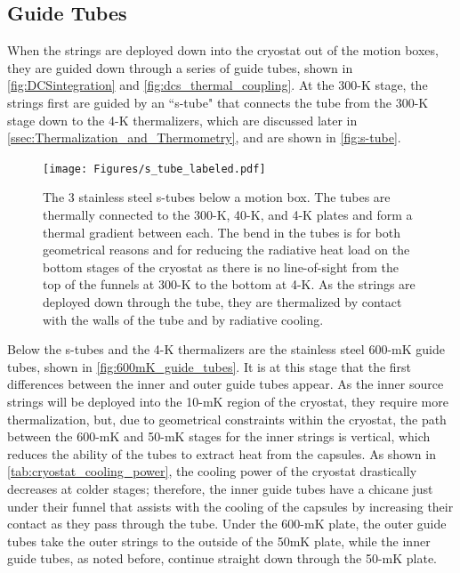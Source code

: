 \subsection*{Guide Tubes}
When the strings are deployed down into the cryostat out of the motion boxes, they are guided down through a series of guide tubes, shown in \autoref{fig:DCSintegration} and \autoref{fig:dcs_thermal_coupling}.
At the 300-K stage, the strings first are guided by an ``s-tube" that connects the tube from the 300-K stage down to the 4-K thermalizers, which are discussed later in \autoref{ssec:Thermalization_and_Thermometry}, and are shown in \autoref{fig:s-tube}.
\begin{figure}[htbp]
    \centering
    \texttt{[image: Figures/s\_tube\_labeled.pdf]}
    \caption[The 3 stainless steel s-tubes below a motion box.]
    {The 3 stainless steel s-tubes below a motion box.
    The tubes are thermally connected to the 300-K, 40-K, and 4-K plates and form a thermal gradient between each.
    The bend in the tubes is for both geometrical reasons and for reducing the radiative heat load on the bottom stages of the cryostat as there is no line-of-sight from the top of the funnels at 300-K to the bottom at 4-K.
    As the strings are deployed down through the tube, they are thermalized by contact with the walls of the tube and by radiative cooling.}
    \label{fig:s-tube}
\end{figure}
Below the s-tubes and the 4-K thermalizers are the stainless steel 600-mK guide tubes, shown in \autoref{fig:600mK_guide_tubes}.
It is at this stage that the first differences between the inner and outer guide tubes appear.
As the inner source strings will be deployed into the 10-mK region of the cryostat, they require more thermalization, but, due to geometrical constraints within the cryostat, the path between the 600-mK and 50-mK stages for the inner strings is vertical, which reduces the ability of the tubes to extract heat from the capsules.
As shown in \autoref{tab:cryostat_cooling_power}, the cooling power of the cryostat drastically decreases at colder stages; therefore, the inner guide tubes have a chicane just under their funnel that assists with the cooling of the capsules by increasing their contact as they pass through the tube.
Under the 600-mK plate, the outer guide tubes take the outer strings to the outside of the 50mK plate, while the inner guide tubes, as noted before, continue straight down through the 50-mK plate.
